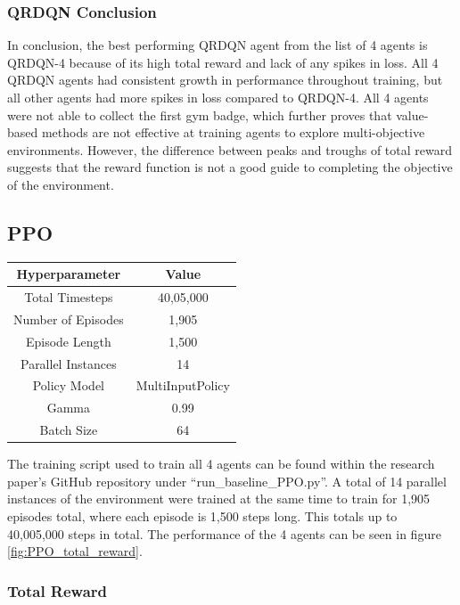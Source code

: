 \subsubsection{QRDQN Conclusion}

In conclusion, the best performing QRDQN agent from the list of 4 agents is QRDQN-4 because of its high total reward and lack of any spikes in loss. All 4 QRDQN agents had consistent growth in performance throughout training, but all other agents had more spikes in loss compared to QRDQN-4. All 4 agents were not able to collect the first gym badge, which further proves that value-based methods are not effective at training agents to explore multi-objective environments. However, the difference between peaks and troughs of total reward suggests that the reward function is not a good guide to completing the objective of the environment.

\subsection{PPO}

\begin{center}
    \begin{tabular}{ |c|c| } 
     \hline
     Hyperparameter & Value \\ 
     \hline
     Total Timesteps & 40,05,000 \\
     Number of Episodes &  1,905 \\
     Episode Length & 1,500 \\ 
     Parallel Instances & 14 \\
     Policy Model & MultiInputPolicy \\
     Gamma & 0.99 \\  
     Batch Size & 64 \\
     \hline
    \end{tabular}
    \end{center}

The training script used to train all 4 agents can be found within the research paper's GitHub repository under ``run\_baseline\_PPO.py''. A total of 14 parallel instances of the environment were trained at the same time to train for 1,905 episodes total, where each episode is 1,500 steps long. This totals up to 40,005,000 steps in total. The performance of the 4 agents can be seen in figure \ref{fig:PPO_total_reward}. 

\subsubsection{Total Reward}

